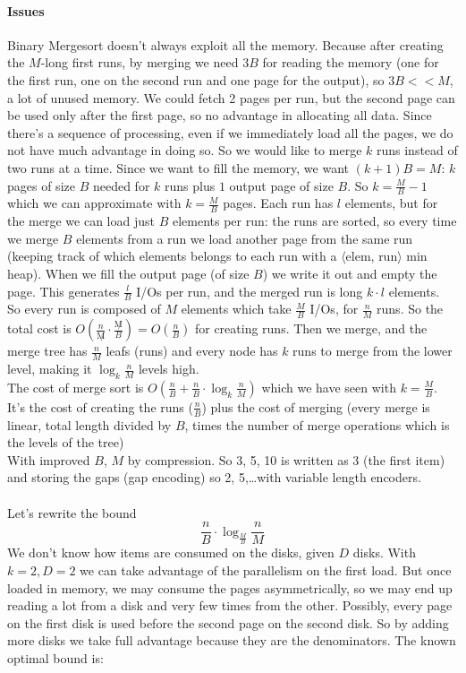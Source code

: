 \documentclass[10pt]{report}
\begin{document}
\paragraph{Issues} Binary Mergesort doesn't always exploit all the memory. Because after creating the $M$-long first runs, by merging we need $3B$ for reading the memory (one for the first run, one on the second run and one page for the output), so $3B << M$, a lot of unused memory. We could fetch 2 pages per run, but the second page can be used only after the first page, so no advantage in allocating all data. Since there's a sequence of processing, even if we immediately load all the pages, we do not have much advantage in doing so. So we would like to merge $k$ runs instead of two runs at a time. Since we want to fill the memory, we want $(k+1)B = M$: $k$ pages of size $B$ needed for $k$ runs plus $1$ output page of size $B$. So $k = \frac{M}{B} - 1$ which we can approximate with $k = \frac{M}{B}$ pages. Each run has $l$ elements, but for the merge we can load just $B$ elements per run: the runs are sorted, so every time we merge $B$ elements from a run we load another page from the same run (keeping track of which elements belongs to each run with a $\langle$elem, run$\rangle$ min heap). When we fill the output page (of size $B$) we write it out and empty the page. This generates $\frac{l}{B}$ I/Os per run, and the merged run is long $k\cdot l$ elements.\\
So every run is composed of $M$ elements which take $\frac{M}{B}$ I/Os, for $\frac{n}{M}$ runs. So the total cost is $O(\frac{n}{\not M} \cdot \frac{\not M}{B}) = O(\frac{n}{B})$ for creating runs. Then we merge, and the merge tree has $\frac{n}{M}$ leafs (runs) and every node has $k$ runs to merge from the lower level, making it $\log_k \frac{n}{M}$ levels high.\\
The cost of merge sort is $O(\frac{n}{B} + \frac{n}{B}\cdot\log_k \frac{n}{M})$ which we have seen with $k = \frac{M}{B}$. It's the cost of creating the runs ($\frac{n}{B}$) plus the cost of merging (every merge is linear, total length divided by $B$, times the number of merge operations which is the levels of the tree)\\
With improved $B$, $M$ by compression. So 3, 5, 10 is written as 3 (the first item) and storing the gaps (gap encoding) so 2, 5,\ldots with variable length encoders.\\\\
Let's rewrite the bound
$$\frac{n}{B}\cdot\log_{\frac{M}{B}}\frac{n}{M}$$
We don't know how items are consumed on the disks, given $D$ disks. With $k = 2, D = 2$ we can take advantage of the parallelism on the first load. But once loaded in memory, we may consume the pages asymmetrically, so we may end up reading a lot from a disk and very few times from the other. Possibly, every page on the first disk is used before the second page on the second disk. So by adding more disks we take full advantage because they are the denominators. The known optimal bound is:
\end{document}
